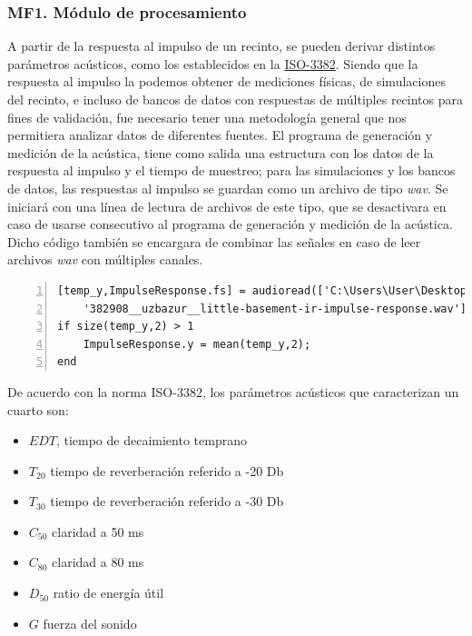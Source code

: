 \subsubsection{MF1. Módulo de procesamiento}


A partir de la respuesta al impulso de un recinto, se pueden derivar distintos parámetros acústicos, como los establecidos en la \href{https://www.iso.org/standard/36201.html}{ISO-3382}. Siendo que la respuesta al impulso la podemos obtener de mediciones físicas, de simulaciones del recinto, e incluso de bancos de datos con respuestas de múltiples recintos para fines de validación, fue necesario tener una metodología general que nos permitiera analizar datos de diferentes fuentes. \hfill\break
El programa de generación y medición de la acústica, tiene como salida una estructura con los datos de la respuesta al impulso y el tiempo de muestreo; para las simulaciones y los bancos de datos, las respuestas al impulso se guardan como un archivo de tipo \textit{wav}. Se iniciará con una línea de lectura de archivos de este tipo, que se desactivara en caso de usarse consecutivo al programa de generación y medición de la acústica. Dicho código también se encargara de combinar las señales en caso de leer archivos \textit{wav} con múltiples canales.
\begin{lstlisting}[frame=single,numbers=left, style=Matlab-editor, basicstyle=\tiny]
[temp_y,ImpulseResponse.fs] = audioread(['C:\Users\User\Desktop\RIR_Database\' ...
    '382908__uzbazur__little-basement-ir-impulse-response.wav']);
if size(temp_y,2) > 1
    ImpulseResponse.y = mean(temp_y,2);
end
\end{lstlisting}
De acuerdo con la norma ISO-3382, los parámetros acústicos que caracterizan un cuarto son:
\begin{itemize}
    \item $EDT$, tiempo de decaimiento temprano
    \item $T_{20}$ tiempo de reverberación referido a -20 Db
    \item $T_{30}$ tiempo de reverberación referido a -30 Db
    \item $C_{50}$ claridad a 50 ms
    \item $C_{80}$ claridad a 80 ms
    \item $D_{50}$ ratio de energía útil
    \item $G$ fuerza del sonido 
\end{itemize}

